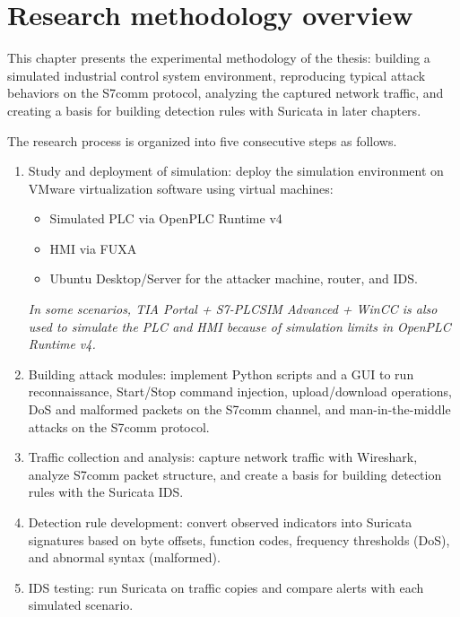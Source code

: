 ﻿\documentclass[../main.tex]{subfiles}
\begin{document}
\section{Research methodology overview}
\label{sec:methodology-overview}

This chapter presents the experimental methodology of the thesis: building a simulated industrial control system environment, reproducing typical attack behaviors on the S7comm protocol, analyzing the captured network traffic, and creating a basis for building detection rules with Suricata in later chapters.

The research process is organized into five consecutive steps as follows.

\begin{enumerate}
    \item Study and deployment of simulation: deploy the simulation environment on VMware virtualization software using virtual machines:
    \begin{itemize}
        \item Simulated PLC via OpenPLC Runtime v4
        \item HMI via FUXA
        \item Ubuntu Desktop/Server for the attacker machine, router, and IDS.
    \end{itemize}

    \textit{In some scenarios, TIA Portal + S7-PLCSIM Advanced + WinCC is also used to simulate the PLC and HMI because of simulation limits in OpenPLC Runtime v4.}
  
    \item Building attack modules: implement Python scripts and a GUI to run reconnaissance, Start/Stop command injection, upload/download operations, DoS and malformed packets on the S7comm channel, and man-in-the-middle attacks on the S7comm protocol.
    
    \item Traffic collection and analysis: capture network traffic with Wireshark, analyze S7comm packet structure, and create a basis for building detection rules with the Suricata IDS.
    
    \item Detection rule development: convert observed indicators into Suricata signatures based on byte offsets, function codes, frequency thresholds (DoS), and abnormal syntax (malformed).
    
    \item IDS testing: run Suricata on traffic copies and compare alerts with each simulated scenario.
    
\end{enumerate}
\end{document}
